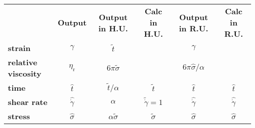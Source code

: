 \documentclass[fontsize=11pt]{scrartcl}
\begin{document}
\begin{center}
  \begin{tabular}{lccccc}
    &   {\bf Output} & {\bf Output in H.U.} &  {\bf Calc in H.U.}
    & {\bf Output in R.U.} &  {\bf Calc in R.U.}
    \\
    {\bf strain} & $\gamma $ & $ \tilde{t}$
    & & $\gamma $
    \\
    {\bf relative viscosity}   &  $ \eta_{\mathrm{r}}$ &
    $6 \pi \tilde{\sigma}$ &  &
    $6 \pi \hat{\sigma}/\alpha$  & \\
    {\bf time}  & $\hat{t}$ & $ \tilde{t}/\alpha$
    &  $\tilde{t} $ & $\hat{t}$ & $\hat{t}$\\
    {\bf shear rate}& $\hat{\dot{\gamma}}$ & $\alpha$ & $\tilde{\dot{\gamma}} = 1$
    & $\hat{\dot{\gamma}}$ & $\hat{\dot{\gamma}}$  \\
    {\bf stress} & $\hat{\sigma}$
       & $\alpha\tilde{\sigma}$  & $\tilde{\sigma} $  &
      $\hat{\sigma}$ &  $\hat{\sigma}$ 
  \end{tabular} 
\end{center}
\end{document}
